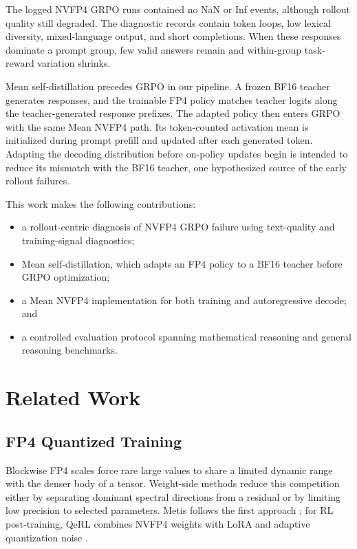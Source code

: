 \documentclass[letterpaper]{article}
\begin{document}
The logged NVFP4 GRPO runs contained no NaN or Inf events, although rollout quality still degraded. The diagnostic records contain token loops, low lexical diversity, mixed-language output, and short completions. When these responses dominate a prompt group, few valid answers remain and within-group task-reward variation shrinks.

Mean self-distillation precedes GRPO in our pipeline. A frozen BF16 teacher generates responses, and the trainable FP4 policy matches teacher logits along the teacher-generated response prefixes. The adapted policy then enters GRPO with the same Mean NVFP4 path. Its token-counted activation mean is initialized during prompt prefill and updated after each generated token. Adapting the decoding distribution before on-policy updates begin is intended to reduce its mismatch with the BF16 teacher, one hypothesized source of the early rollout failures.

This work makes the following contributions:
\begin{itemize}
    \item a rollout-centric diagnosis of NVFP4 GRPO failure using text-quality and training-signal diagnostics;
    \item Mean self-distillation, which adapts an FP4 policy to a BF16 teacher before GRPO optimization;
    \item a Mean NVFP4 implementation for both training and autoregressive decode; and
    \item a controlled evaluation protocol spanning mathematical reasoning and general reasoning benchmarks.
\end{itemize}

\section{Related Work}

\subsection{FP4 Quantized Training}

Blockwise FP4 scales force rare large values to share a limited dynamic range with the denser body of a tensor. Weight-side methods reduce this competition either by separating dominant spectral directions from a residual or by limiting low precision to selected parameters. Metis follows the first approach \citep{cao2025metis}; for RL post-training, QeRL combines NVFP4 weights with LoRA and adaptive quantization noise \citep{huang2025qerl}.
\end{document}
